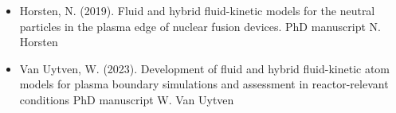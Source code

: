 \begin{itemize}
    First benchmark between AFN and EIRENE in the presence of drifts.
    \item Horsten, N. (2019). Fluid and hybrid fluid-kinetic models for the neutral particles in the plasma edge of nuclear fusion devices. \newline \newline
    PhD manuscript N. Horsten
    \item Van Uytven, W. (2023). Development of fluid and hybrid fluid-kinetic atom models for plasma boundary simulations and assessment in reactor-relevant conditions \newline \newline
    PhD manuscript W. Van Uytven
\end{itemize}
